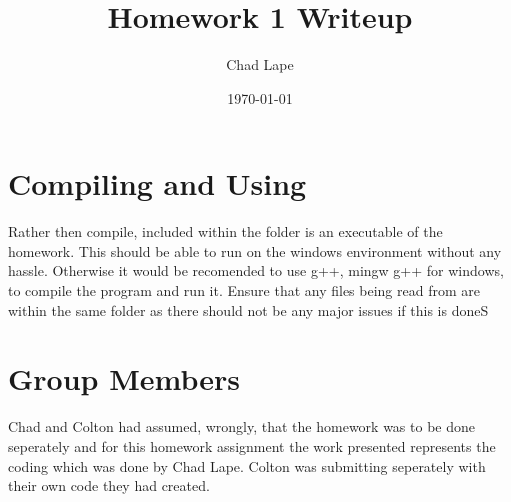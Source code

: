 \documentclass[a4paper, 12pt]{article}
\begin{document}
	\title{Homework 1 Writeup}
	\author{Chad Lape}
	\date{\today}
	\maketitle
	
\section{Compiling and Using}
	Rather then compile, included within the folder is an executable of the homework. This should be able to run on the windows environment without any hassle. Otherwise it would be recomended to use g++, mingw g++ for windows, to compile the program and run it. Ensure that any files being read from are within the same folder as there should not be any major issues if this is doneS
	
\section{Group Members}
	Chad and Colton had assumed, wrongly, that the homework was to be done seperately and for this homework assignment the work presented represents the coding which was done by Chad Lape. Colton was submitting seperately with their own code they had created.
\end{document}
